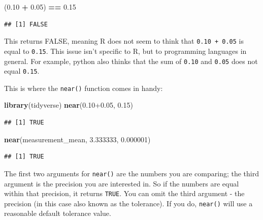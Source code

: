 \documentclass[
  12pt,
  krantz2]{krantz}
\makeatletter
\newenvironment{Shaded}{\begin{snugshade}}{\end{snugshade}}
\newcommand{\FloatTok}[1]{\textcolor[rgb]{0.00,0.00,0.81}{#1}}
\newcommand{\KeywordTok}[1]{\textcolor[rgb]{0.13,0.29,0.53}{\textbf{#1}}}
\newcommand{\NormalTok}[1]{#1}
\newcommand{\OperatorTok}[1]{\textcolor[rgb]{0.81,0.36,0.00}{\textbf{#1}}}
\newcommand{\StringTok}[1]{\textcolor[rgb]{0.31,0.60,0.02}{#1}}
\newenvironment{kframe}{%
\medskip{}
\setlength{\fboxsep}{.8em}
 \def\at@end@of@kframe{}%
 \ifinner\ifhmode%
  \def\at@end@of@kframe{\end{minipage}}%
  \begin{minipage}{\columnwidth}%
 \fi\fi%
 \def\FrameCommand##1{\hskip\@totalleftmargin \hskip-\fboxsep
 \colorbox{shadecolor}{##1}\hskip-\fboxsep
     \hskip-\linewidth \hskip-\@totalleftmargin \hskip\columnwidth}%
 \MakeFramed {\advance\hsize-\width
   \@totalleftmargin\z@ \linewidth\hsize
   \@setminipage}}%
 {\par\unskip\endMakeFramed%
 \at@end@of@kframe}
\renewenvironment{Shaded}{\begin{kframe}}{\end{kframe}}
\makeatother
\begin{document}
\begin{Shaded}
\begin{Highlighting}[]
\NormalTok{(}\FloatTok{0.10} \OperatorTok{+}\StringTok{ }\FloatTok{0.05}\NormalTok{) }\OperatorTok{==}\StringTok{ }\FloatTok{0.15}
\end{Highlighting}
\end{Shaded}

\begin{verbatim}
## [1] FALSE
\end{verbatim}

This returns FALSE, meaning R does not seem to think that \texttt{0.10\ +\ 0.05} is equal to \texttt{0.15}. This issue isn't specific to R, but to programming languages in general. For example, python also thinks that the sum of \texttt{0.10} and \texttt{0.05} does not equal \texttt{0.15}.

This is where the \texttt{near()} function comes in handy:


\begin{Shaded}
\begin{Highlighting}[]
\KeywordTok{library}\NormalTok{(tidyverse)}
\KeywordTok{near}\NormalTok{(}\FloatTok{0.10+0.05}\NormalTok{, }\FloatTok{0.15}\NormalTok{)}
\end{Highlighting}
\end{Shaded}

\begin{verbatim}
## [1] TRUE
\end{verbatim}

\begin{Shaded}
\begin{Highlighting}[]
\KeywordTok{near}\NormalTok{(measurement_mean, }\FloatTok{3.333333}\NormalTok{, }\FloatTok{0.000001}\NormalTok{)}
\end{Highlighting}
\end{Shaded}

\begin{verbatim}
## [1] TRUE
\end{verbatim}

The first two arguments for \texttt{near()} are the numbers you are comparing; the third argument is the precision you are interested in. So if the numbers are equal within that precision, it returns \texttt{TRUE}. You can omit the third argument - the precision (in this case also known as the tolerance). If you do, \texttt{near()} will use a reasonable default tolerance value.
\end{document}
